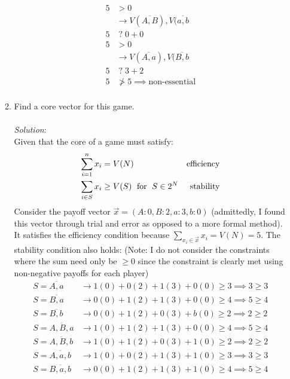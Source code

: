 \documentclass{article}
\newcommand*{\unknown}[0]{\;?\;}
\begin{document}
\begin{enumerate}
\begin{enumerate}
\begin{align*}
    5                        &>           0                                                    \\
                             &\rightarrow V(\overline{A, B}), V(\overline{a, b}                \\
    5                        &\unknown    0                 + 0                                \\
    5                        &>           0                                                    \\
                             &\rightarrow V(\overline{A, a}), V(\overline{B, b}                \\
    5                        &\unknown    3                 + 2                                \\
    5                        &\not>       5                                                    \implies \text{non-essential} \\
    \end{align*}

    \item Find a core vector for this game. \\\\
    \textit{Solution}:\\
    Given that the core of a game must satisfy:
    \begin{align}
    \sum^{n}_{i = 1}{x_{i}}  &=    V(N)                                &  \text{efficiency}\\
    \sum_{i \in S}{x_{i}}    &\ge  V(S) \text{\; for \;} S \in 2^{N}   &  \text{stability}
    \end{align}
    Consider the payoff vector $\vec{x} = (A: 0, B: 2, a: 3, b: 0)$ (admittedly, I found this vector through trial and error as opposed to a more formal method). It satisfies the efficiency condition because $\sum_{x_{i} \in \vec{x}}{x_{i}} = V(N) = 5$.
    The stability condition also holds:
    (Note: I do not consider the constraints where the sum need only be $\ge 0$ since the constraint is clearly met using non-negative payoffs for each player)
    \begin{align*}
    S = \overline{A, a}     &\rightarrow 1(0) + 0(2) + 1(3) + 0(0) \ge 3  \implies  3  \ge  3\\
    S = \overline{B, a}     &\rightarrow 0(0) + 1(2) + 1(3) + 0(0) \ge 4  \implies  5  \ge  4\\
    S = \overline{B, b}     &\rightarrow 0(0) + 1(2) + 0(3) + b(0) \ge 2  \implies  2  \ge  2\\
    S = \overline{A, B, a}  &\rightarrow 1(0) + 1(2) + 1(3) + 0(0) \ge 4  \implies  5  \ge  4\\
    S = \overline{A, B, b}  &\rightarrow 1(0) + 1(2) + 0(3) + 1(0) \ge 2  \implies  2  \ge  2\\
    S = \overline{A, a, b}  &\rightarrow 1(0) + 0(2) + 1(3) + 1(0) \ge 3  \implies  3  \ge  3\\
    S = \overline{B, a, b}  &\rightarrow 0(0) + 1(2) + 1(3) + 1(0) \ge 4  \implies  5  \ge  4\\
    \end{align*}


\end{enumerate}
\end{enumerate}
\end{document}
